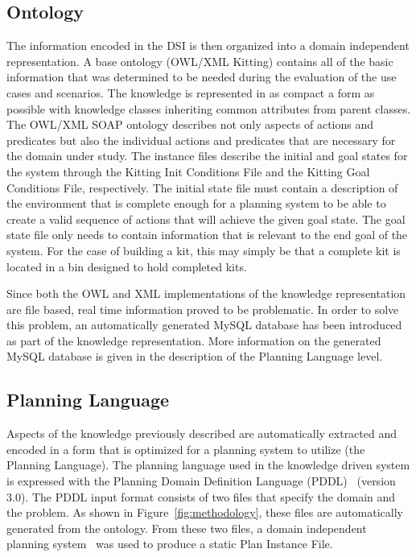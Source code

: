 \subsection{Ontology}
\label{sub:ontology}
The information encoded in the DSI is then organized into a domain
independent representation. A base ontology (\textsf{OWL/XML Kitting})
contains all of the basic information that was determined to be needed
during the evaluation of the use cases and scenarios. The knowledge is
represented in as compact a form as possible with knowledge classes
inheriting common attributes from parent classes. The \textsf{OWL/XML SOAP}
ontology describes not only aspects of actions and predicates but also the
individual actions and predicates that are necessary for the domain under
study. The instance files describe the initial and goal states for the
system through the \textsf{Kitting Init Conditions File} and the
\textsf{Kitting Goal Conditions File}, respectively. The initial state file
must contain a description of the environment that is complete enough for a
planning system to be able to create a valid sequence of actions that will
achieve the given goal state. The goal state file only needs to contain
information that is relevant to the end goal of the system. For the case of building a kit, this may simply be that a complete kit is located in a bin designed to hold completed kits.

Since both the OWL and XML implementations of the knowledge representation are file based, real time information proved to be problematic. In order to solve this problem, an automatically generated MySQL database has been introduced as part of the knowledge representation. More information on the generated MySQL database is given in the description of the Planning Language level.


\subsection{Planning Language}
Aspects of the knowledge previously described are automatically extracted and encoded in a form
that is optimized for a planning system to utilize (the Planning Language).
The planning language used in the knowledge driven system is expressed with
the Planning Domain Definition Language (PDDL)~\cite{PDDL} (version 3.0).
The PDDL input format consists of two files that specify the domain and the
problem. As shown in Figure~\ref{fig:methodology}, these files are
automatically generated from the ontology. From
these two files, a domain independent planning
system~\cite{Coles.ICAPS.2010} was used to produce a static \textsf{Plan Instance File}.

